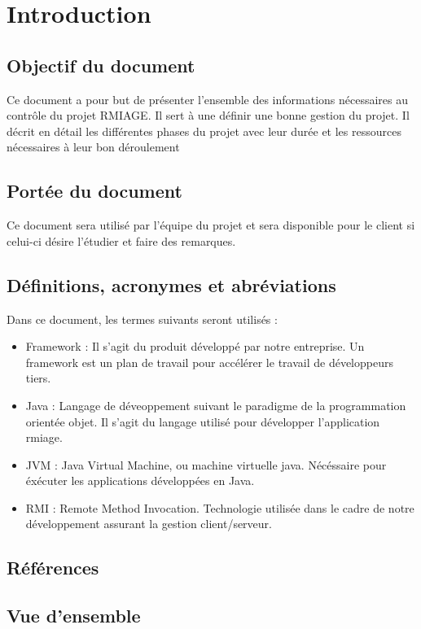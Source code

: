 \section{Introduction}
\subsection{Objectif du document}
Ce document a pour but de présenter l'ensemble des informations nécessaires au
contrôle du projet RMIAGE. Il sert à une définir une bonne gestion du projet.
Il décrit en détail les différentes phases du projet avec leur durée et les ressources nécessaires à leur bon 	déroulement

\subsection{Portée du document}
Ce document sera utilisé par l’équipe du projet et sera disponible pour le client si celui-ci désire l’étudier et faire des remarques. 

\subsection{Définitions, acronymes et abréviations}
Dans ce document, les termes suivants seront utilisés :
\begin{itemize}
	\item Framework :
Il s'agit du produit développé par notre entreprise. Un framework est un plan de travail pour accélérer le travail de développeurs tiers.
	\item Java :
Langage de déveoppement suivant le paradigme de la programmation orientée objet. Il s'agit du langage utilisé pour développer l'application rmiage.
	\item JVM :
Java Virtual Machine, ou machine virtuelle java. Nécéssaire pour éxécuter les applications développées en Java.
	\item RMI :
Remote Method Invocation. Technologie utilisée dans le cadre de notre développement assurant
la gestion client/serveur.
\end{itemize}

\subsection{Références}
\subsection{Vue d’ensemble}
